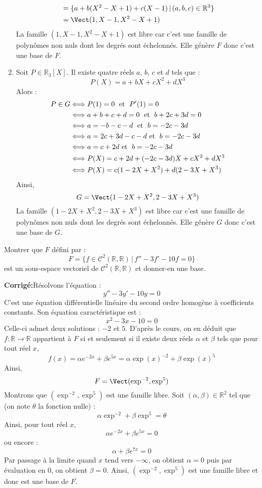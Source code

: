 \documentclass[a4paper,twoside,french,10pt]{VcCours}
\newcommand{\corr}{\textbf{Corrigé:}}
\begin{document}
\begin{enumerate}
\begin{align*}
& = \lbrace a + b(X^2-X+1)+ c (X-1) \, \vert \, (a,b,c) \in \mathbb{R}^3 \rbrace \\ 
& = \Vect(1,X-1,X^2-X+1)
\end{align*}
La famille $(1,X-1,X^2-X+1)$ est libre car c'est une famille de polynômes non nuls dont les degrés sont échelonnés. Elle génère $F$ donc c'est une base de $F$.
\item Soit $P \in \mathbb{R}_3[X]$. Il existe quatre réels $a$, $b$, $c$ et $d$ tels que :
$$ P(X) = a +bX+cX^2+dX^3$$
Alors :
\begin{align*}
P \in G & \Longleftrightarrow P(1)=0 \; \hbox{ et } \; P'(1)=0 \\
& \Longleftrightarrow a+b+c+d = 0 \; \hbox{ et } \; b+2c+3d = 0 \\
& \Longleftrightarrow a=-b-c-d \; \hbox{ et } \; b=-2c-3d \\
& \Longleftrightarrow a = 2c+3d-c-d  \hbox{ et } \; b=-2c-3d \\
& \Longleftrightarrow a = c +2d \hbox{ et } \; b=-2c-3d \\
& \Longleftrightarrow P(X) = c+2d + (-2c-3d)X + c X^2 + dX^3 \\
& \Longleftrightarrow P(X) = c (1-2X+X^2)+ d (2-3X+X^3)
\end{align*}
Ainsi,
$$ G = \Vect(1-2X+X^2,2-3X+X^3)$$
La famille $(1-2X+X^2,2-3X+X^3)$ est libre car c'est une famille de polynômes non nuls dont les degrés sont échelonnés. Elle génère $G$ donc c'est une base de $G$.
\end{enumerate}

\medskip


\begin{Exercice}{} Montrer que $F$ défini par :
$$ F=\lbrace f \in \mathcal{C}^2(\mathbb{R}, \mathbb{R}) \, \vert \,  f''-3f'-10f= 0 \rbrace $$
est un sous-espace vectoriel de $\mathcal{C}^2(\mathbb{R}, \mathbb{R})$ et donner-en une base.
\end{Exercice} 

\corr Résolvons l'équation :
$$ y''-3y'-10y = 0$$
C'est une équation différentielle linéaire du second ordre homogène à coefficients constants. Son équation caractéristique est :
$$ x^2-3x-10=0$$
Celle-ci admet deux solutions : $-2$ et $5$. D'après le cours, on en déduit que $f : \mathbb{R} \rightarrow \mathbb{R}$ appartient à $F$ si et seulement si il existe deux réels $\alpha$ et $\beta$ tels que pour tout réel $x$,
$$ f(x) = \alpha e^{-2x} + \beta e^{5x} = \alpha \exp(x)^{-2} + \beta \exp(x)^5$$
Ainsi,
$$ F = \Vect(\exp^{-2}, \exp^5)$$
Montrons que $(\exp^{-2}, \exp^5)$ est une famille libre. Soit $(\alpha, \beta) \in \mathbb{R}^2$ tel que (on note $\theta$ la fonction nulle) :
$$ \alpha \exp^{-2} + \beta \exp^5 = \theta$$
Ainsi, pour tout réel $x$,
$$ \alpha e^{-2x} + \beta e^{5x} = 0$$
ou encore :
$$ \alpha  + \beta e^{7x} = 0$$
Par passage à la limite quand $x$ tend vers $- \infty$, on obtient $\alpha=0$ puis par évaluation en $0$, on obtient $\beta =0$. Ainsi, $(\exp^{-2}, \exp^5)$ est une famille libre et donc est une base de $F$.
\end{document}
